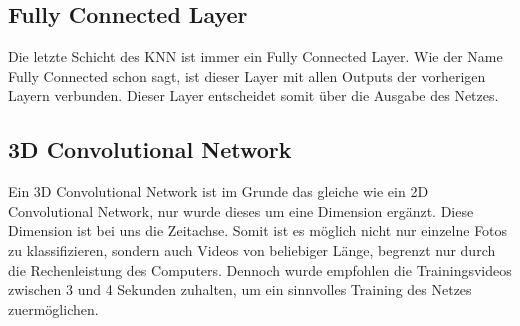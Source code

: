 \subsection{Fully Connected Layer}
Die letzte Schicht des \acs{KNN} ist immer ein Fully Connected Layer. Wie der Name Fully Connected schon sagt, ist dieser Layer mit allen Outputs der vorherigen Layern verbunden. Dieser Layer entscheidet somit über die Ausgabe des Netzes.

\subsection{3D Convolutional Network}
Ein 3D Convolutional Network ist im Grunde das gleiche wie ein 2D Convolutional Network, nur wurde dieses um eine Dimension ergänzt. Diese Dimension ist bei uns die Zeitachse. Somit ist es möglich nicht nur einzelne Fotos zu klassifizieren, sondern auch Videos von beliebiger Länge, begrenzt nur durch die Rechenleistung des Computers. Dennoch wurde empfohlen die Trainingsvideos zwischen 3 und 4 Sekunden zuhalten, um ein sinnvolles Training des Netzes zuermöglichen.
